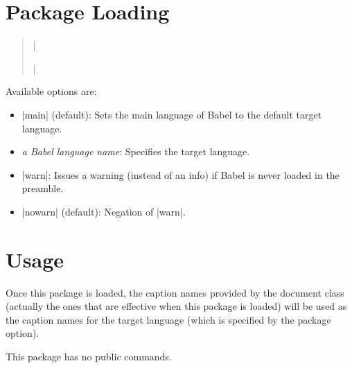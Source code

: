 \documentclass[a4paper]{article}
\newcommand{\Meta}[1]{$\langle$#1$\rangle$}
\newcommand{\Means}{:\quad}
\begin{document}
\section{Package Loading}
\label{sec:Package-Loading}

\begin{quote}
|\usepackage[|\Meta{option}|,...]{bxorigcapt}|
\end{quote}

Available options are:
\begin{itemize}
\item |main| (default)\Means
  Sets the main language of Babel to the default target language.
\item \emph{a Babel language name}\Means
  Specifies the target language.
\item |warn|\Means
  Issues a warning (instead of an info)
  if Babel is never loaded in the preamble.
\item |nowarn| (default)\Means
  Negation of |warn|.
\end{itemize}


\section{Usage}
\label{sec:Usage}

Once this package is loaded,
the caption names provided by the document class
(actually the ones that are effective when this package is loaded)
will be used as the caption names for the target language
(which is specified by the package option).

This package has no public commands.


\end{document}
